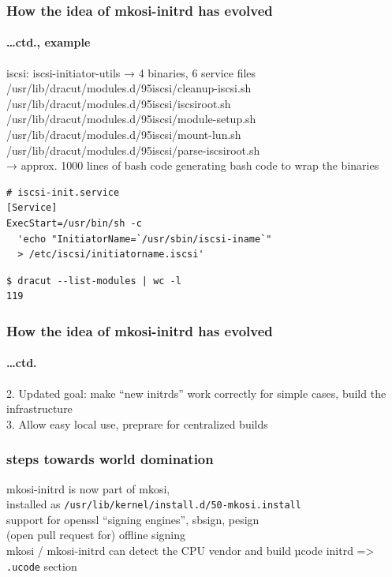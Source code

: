 \documentclass[]{beamer}
\newcommand\pp{}
\begin{document}
\begin{frame}[fragile]
  \frametitle{How the idea of mkosi-initrd has evolved}
  \framesubtitle{…ctd., example}

  \pp
  iscsi:
  iscsi-initiator-utils
  → 4 binaries, 6 service files
  \\

  \pp
  /usr/lib/dracut/modules.d/95iscsi/cleanup-iscsi.sh
  /usr/lib/dracut/modules.d/95iscsi/iscsiroot.sh
  /usr/lib/dracut/modules.d/95iscsi/module-setup.sh
  /usr/lib/dracut/modules.d/95iscsi/mount-lun.sh
  /usr/lib/dracut/modules.d/95iscsi/parse-iscsiroot.sh\\
  → approx. 1000 lines of bash code generating bash code to wrap the binaries
  \pp

  \begin{verbatim}
# iscsi-init.service
[Service]
ExecStart=/usr/bin/sh -c
  'echo "InitiatorName=`/usr/sbin/iscsi-iname`"
  > /etc/iscsi/initiatorname.iscsi'
  \end{verbatim}

  \pp
  \begin{verbatim}
$ dracut --list-modules | wc -l
119
\end{verbatim}
\end{frame}

\begin{frame}
  \frametitle{How the idea of mkosi-initrd has evolved}
  \framesubtitle{…ctd.}

  \pp
  2. Updated goal: make ``new initrds'' work correctly for simple cases, build the infrastructure
  \\

  \pp
  3. Allow easy local use, preprare for centralized builds
\end{frame}

\begin{frame}
  \frametitle{steps towards world domination}

  \pp
  mkosi-initrd is now part of mkosi,\\
  installed as \texttt{/usr/lib/kernel/install.d/50-mkosi.install}
  \\

  \pp
  support for openssl ``signing engines'', sbsign, pesign\\
  \pp
  (open pull request for) offline signing
  \\
  
  \pp
  mkosi / mkosi-initrd can detect the CPU vendor and build µcode initrd
  => \texttt{.ucode} section
\end{frame}
\end{document}
